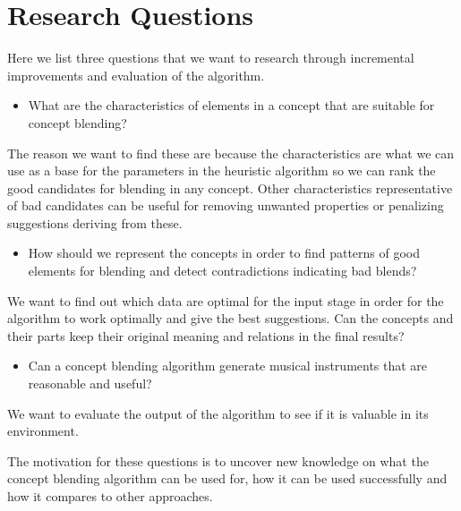 \section{Research Questions}
Here we list three questions that we want to research through incremental improvements and evaluation of the algorithm.
\begin{itemize}
\item What are the characteristics of elements in a concept that are suitable for concept blending?
\end{itemize}
The reason we want to find these are because the characteristics are what we can use as a base for the parameters in the heuristic algorithm so we can rank the good candidates for blending in any concept. Other characteristics representative of bad candidates can be useful for removing unwanted properties or penalizing suggestions deriving from these.
\begin{itemize}
\item How should we represent the concepts in order to find patterns of good elements for blending and detect contradictions indicating bad blends?
\end{itemize}
We want to find out which data are optimal for the input stage in order for the algorithm to work optimally and give the best suggestions. Can the concepts and their parts keep their original meaning and relations in the final results?
\begin{itemize}
\item Can a concept blending algorithm generate musical instruments that are reasonable and useful?
\end{itemize}
We want to evaluate the output of the algorithm to see if it is valuable in its environment.

The motivation for these questions is to uncover new knowledge on what the concept blending algorithm can be used for, how it can be used successfully and how it compares to other approaches.

